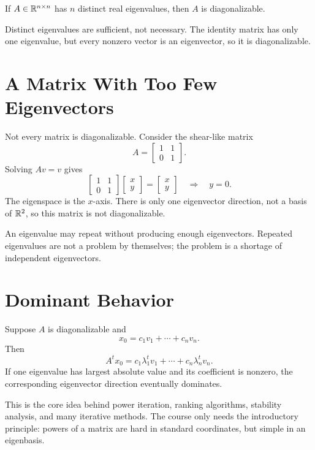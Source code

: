 \begin{corollary}
If $A\in\mathbb{R}^{n\times n}$ has $n$ distinct real eigenvalues, then $A$ is
diagonalizable.
\end{corollary}

Distinct eigenvalues are sufficient, not necessary. The identity matrix has
only one eigenvalue, but every nonzero vector is an eigenvector, so it is
diagonalizable.

\section{A Matrix With Too Few Eigenvectors}

Not every matrix is diagonalizable. Consider the shear-like matrix
\[
  A=\begin{bmatrix}1&1\\0&1\end{bmatrix}.
\]
Solving $Av=v$ gives
\[
  \begin{bmatrix}1&1\\0&1\end{bmatrix}
  \begin{bmatrix}x\\y\end{bmatrix}
  =
  \begin{bmatrix}x\\y\end{bmatrix}
  \quad\Longrightarrow\quad
  y=0.
\]
The eigenspace is the $x$-axis. There is only one eigenvector direction, not a
basis of $\mathbb{R}^2$, so this matrix is not diagonalizable.

\begin{warningbox}
An eigenvalue may repeat without producing enough eigenvectors. Repeated
eigenvalues are not a problem by themselves; the problem is a shortage of
independent eigenvectors.
\end{warningbox}

\section{Dominant Behavior}

Suppose $A$ is diagonalizable and
\[
  x_0=c_1v_1+\cdots+c_nv_n.
\]
Then
\[
  A^t x_0
  =
  c_1\lambda_1^t v_1+\cdots+c_n\lambda_n^t v_n.
\]
If one eigenvalue has largest absolute value and its coefficient is nonzero,
the corresponding eigenvector direction eventually dominates.

This is the core idea behind power iteration, ranking algorithms, stability
analysis, and many iterative methods. The course only needs the introductory
principle: powers of a matrix are hard in standard coordinates, but simple in
an eigenbasis.


